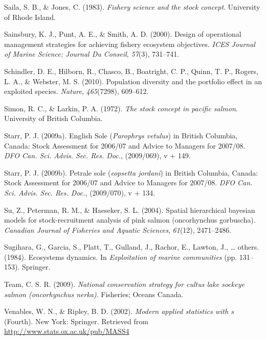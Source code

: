 \documentclass[12pt,]{scrartcl}
\begin{document}
\hypertarget{ref-saila1983fishery}{}
Saila, S. B., \& Jones, C. (1983). \emph{Fishery science and the stock
concept}. University of Rhode Island.

\hypertarget{ref-sainsbury2000design}{}
Sainsbury, K. J., Punt, A. E., \& Smith, A. D. (2000). Design of
operational management strategies for achieving fishery ecosystem
objectives. \emph{ICES Journal of Marine Science: Journal Du Conseil},
\emph{57}(3), 731--741.

\hypertarget{ref-schindler2010population}{}
Schindler, D. E., Hilborn, R., Chasco, B., Boatright, C. P., Quinn, T.
P., Rogers, L. A., \& Webster, M. S. (2010). Population diversity and
the portfolio effect in an exploited species. \emph{Nature},
\emph{465}(7298), 609--612.

\hypertarget{ref-simon1972stock}{}
Simon, R. C., \& Larkin, P. A. (1972). \emph{The stock concept in
pacific salmon}. University of British Columbia.

\hypertarget{ref-starr2009english-so}{}
Starr, P. J. (2009a). English Sole (\emph{Parophrys vetulus}) in British
Columbia, Canada: Stock Assessment for 2006/07 and Advice to Managers
for 2007/08. \emph{DFO Can. Sci. Advis. Sec. Res. Doc.}, (2009/069), v +
149.

\hypertarget{ref-starr2009petrale-so}{}
Starr, P. J. (2009b). Petrale sole (\emph{eopsetta jordani}) in British
Columbia, Canada: Stock Assessment for 2006/07 and Advice to Managers
for 2007/08. \emph{DFO Can. Sci. Advis. Sec. Res. Doc.}, (2009/070), v +
134.

\hypertarget{ref-su2004spatial}{}
Su, Z., Peterman, R. M., \& Haeseker, S. L. (2004). Spatial hierarchical
bayesian models for stock-recruitment analysis of pink salmon
(oncorhynchus gorbuscha). \emph{Canadian Journal of Fisheries and
Aquatic Sciences}, \emph{61}(12), 2471--2486.

\hypertarget{ref-sugihara1984ecosystems}{}
Sugihara, G., Garcia, S., Platt, T., Gulland, J., Rachor, E., Lawton,
J., \ldots{} others. (1984). Ecosystems dynamics. In \emph{Exploitation
of marine communities} (pp. 131--153). Springer.

\hypertarget{ref-team2009national}{}
Team, C. S. R. (2009). \emph{National conservation strategy for cultus
lake sockeye salmon (oncorhynchus nerka)}. Fisheries; Oceans Canada.

\hypertarget{ref-venables2002modern}{}
Venables, W. N., \& Ripley, B. D. (2002). \emph{Modern applied
statistics with s} (Fourth). New York: Springer. Retrieved from
\url{http://www.stats.ox.ac.uk/pub/MASS4}
\end{document}
